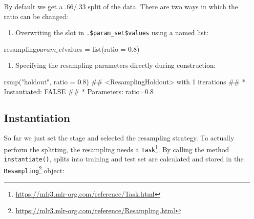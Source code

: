 \documentclass[12pt,]{scrbook}
\newenvironment{Shaded}{}{}
\newcommand{\DataTypeTok}[1]{#1}
\newcommand{\FloatTok}[1]{#1}
\newcommand{\KeywordTok}[1]{\textcolor[rgb]{0.00,0.00,1.00}{#1}}
\newcommand{\NormalTok}[1]{#1}
\newcommand{\OperatorTok}[1]{#1}
\newcommand{\StringTok}[1]{\textcolor[rgb]{0.00,0.50,0.50}{#1}}
\providecommand{\tightlist}{%
  \setlength{\itemsep}{0pt}\setlength{\parskip}{0pt}}
\renewcommand{\href}[2]{#2\footnote{\url{#1}}}
\begin{document}
By default we get a .66/.33 split of the data.
There are two ways in which the ratio can be changed:

\begin{enumerate}
\def\labelenumi{\arabic{enumi}.}
\tightlist
\item
  Overwriting the slot in \texttt{.\$param\_set\$values} using a named list:
\end{enumerate}

\begin{Shaded}
\begin{Highlighting}[]
\NormalTok{resampling}\OperatorTok{$}\NormalTok{param_set}\OperatorTok{$}\NormalTok{values =}\StringTok{ }\KeywordTok{list}\NormalTok{(}\DataTypeTok{ratio =} \FloatTok{0.8}\NormalTok{)}
\end{Highlighting}
\end{Shaded}

\begin{enumerate}
\def\labelenumi{\arabic{enumi}.}
\setcounter{enumi}{1}
\tightlist
\item
  Specifying the resampling parameters directly during construction:
\end{enumerate}

\begin{Shaded}
\begin{Highlighting}[]
\KeywordTok{rsmp}\NormalTok{(}\StringTok{"holdout"}\NormalTok{, }\DataTypeTok{ratio =} \FloatTok{0.8}\NormalTok{)}
\NormalTok{## <ResamplingHoldout> with 1 iterations}
\NormalTok{## * Instantiated: FALSE}
\NormalTok{## * Parameters: ratio=0.8}
\end{Highlighting}
\end{Shaded}

\hypertarget{resampling-inst}{%
\subsection{Instantiation}\label{resampling-inst}}

So far we just set the stage and selected the resampling strategy.
To actually perform the splitting, the resampling needs a \href{https://mlr3.mlr-org.com/reference/Task.html}{\texttt{Task}}.
By calling the method \texttt{instantiate()}, splits into training and test set are calculated and stored in the \href{https://mlr3.mlr-org.com/reference/Resampling.html}{\texttt{Resampling}} object:
\end{document}
